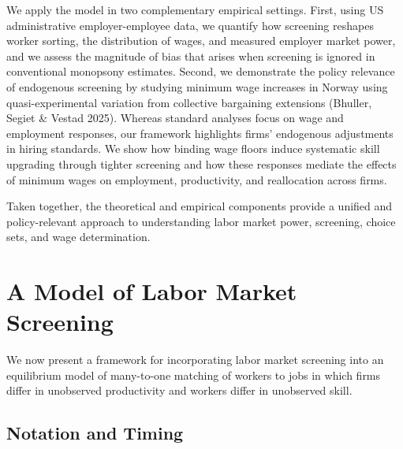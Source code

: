 \documentclass[11pt]{article}
\begin{document}
We apply the model in two complementary empirical settings. First, using US administrative employer-employee data, we quantify how screening reshapes worker sorting, the distribution of wages, and measured employer market power, and we assess the magnitude of bias that arises when screening is ignored in conventional monopsony estimates. Second, we demonstrate the policy relevance of endogenous screening by studying minimum wage increases in Norway using quasi-experimental variation from collective bargaining extensions (Bhuller, Segiet \& Vestad 2025). Whereas standard analyses focus on wage and employment responses, our framework highlights firms’ endogenous adjustments in hiring standards. We show how binding wage floors induce systematic skill upgrading through tighter screening and how these responses mediate the effects of minimum wages on employment, productivity, and reallocation across firms.

Taken together, the theoretical and empirical components provide a unified and policy-relevant approach to understanding labor market power, screening, choice sets, and wage determination.

\section{A Model of Labor Market Screening}

We now present a framework for incorporating labor market screening into an equilibrium model of many-to-one matching of workers to jobs in which firms differ in unobserved productivity and workers differ in unobserved skill.

\subsection{Notation and Timing}
\end{document}
